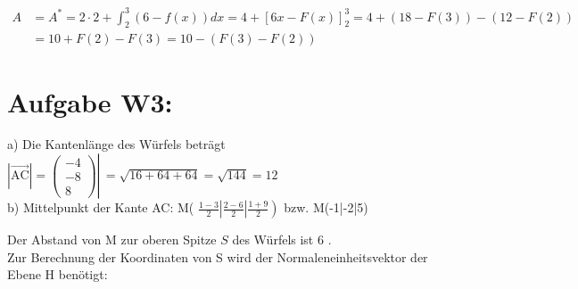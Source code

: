 \documentclass[10pt]{article}
\begin{document}
$$
\begin{aligned}
A & =A^{*}=2 \cdot 2+\int_{2}^{3}(6-f(x)) d x=4+[6 x-F(x)]_{2}^{3}=4+(18-F(3))-(12-F(2)) \\
& =10+F(2)-F(3)=10-(F(3)-F(2))
\end{aligned}
$$

\section*{Aufgabe W3:}
a) Die Kantenlänge des Würfels beträgt $\left.|\overrightarrow{\mathrm{AC}}|=\left(\begin{array}{c}-4 \\ -8 \\ 8\end{array}\right) \right\rvert\,=\sqrt{16+64+64}=\sqrt{144}=12$\\
b) Mittelpunkt der Kante AC: M( $\left.\frac{1-3}{2}\left|\frac{2-6}{2}\right| \frac{1+9}{2}\right)$ bzw. M(-1|-2|5)

Der Abstand von M zur oberen Spitze $S$ des Würfels ist 6 .\\
Zur Berechnung der Koordinaten von S wird der Normaleneinheitsvektor der Ebene H benötigt:
\end{document}
